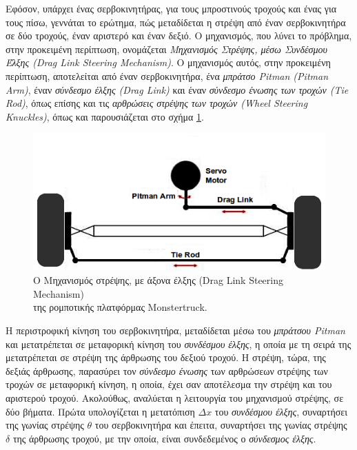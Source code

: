 \bigskip
Εφόσον, υπάρχει ένας σερβοκινητήρας, για τους μπροστινούς τροχούς και ένας για τους πίσω, γεννάται το ερώτημα, πώς μεταδίδεται η στρέψη από έναν σερβοκινητήρα σε δύο τροχούς, έναν αριστερό και έναν δεξιό. Ο μηχανισμός, που λύνει το πρόβλημα, στην προκειμένη περίπτωση, ονομάζεται \textit{Μηχανισμός Στρέψης, μέσω Συνδέσμου Έλξης (Drag Link Steering Mechanism)}. Ο  μηχανισμός αυτός, στην προκειμένη περίπτωση, αποτελείται από έναν σερβοκινητήρα, ένα \textit{μπράτσο Pitman (Pitman Arm)}, έναν \textit{σύνδεσμο έλξης (Drag Link)} και έναν \textit{σύνδεσμο ένωσης των τροχών (Tie Rod)}, όπως επίσης και τις \textit{αρθρώσεις στρέψης των τροχών (Wheel Steering Knuckles)}, όπως και παρουσιάζεται στο σχήμα \ref{fig:drag_link_steering}.

\begin{figure}[!ht]
	\centering
	\includegraphics[width=0.6\linewidth]{Chapters/Chapter2/Figures/my_drag_link_steering.png}
	\caption{Ο Μηχανισμός στρέψης, με άξονα έλξης (Drag Link Steering Mechanism)
	\\της ρομποτικής πλατφόρμας Monstertruck.}
	\label{fig:drag_link_steering}
\end{figure}

\bigskip
Η περιστροφική κίνηση του σερβοκινητήρα, μεταδίδεται μέσω του \textit{μπράτσου Pitman} και μετατρέπεται σε μεταφορική κίνηση του \textit{συνδέσμου έλξης}, η οποία με τη σειρά της μετατρέπεται σε στρέψη της άρθρωσης του δεξιού τροχού. Η στρέψη, τώρα, της δεξιάς άρθρωσης, παρασύρει τον \textit{σύνδεσμο ένωσης} των αρθρώσεων στρέψης των τροχών σε μεταφορική κίνηση, η οποία, έχει σαν αποτέλεσμα την στρέψη και του αριστερού τροχού. Ακολούθως, αναλύεται η λειτουργία του μηχανισμού στρέψης, σε δύο βήματα. Πρώτα υπολογίζεται η μετατόπιση $\Delta x$ του \textit{συνδέσμου έλξης}, συναρτήσει της γωνίας στρέψης $\theta$ του σερβοκινητήρα και έπειτα, συναρτήσει της γωνίας στρέψης $\delta$ της άρθρωσης τροχού, με την οποία, είναι συνδεδεμένος ο \textit{σύνδεσμος έλξης}.

